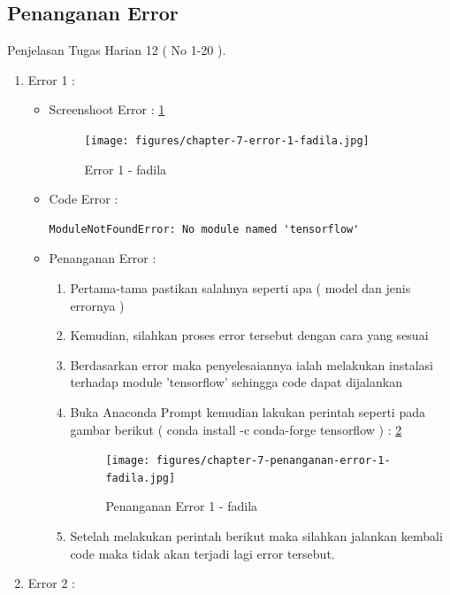 \subsection{Penanganan Error}
Penjelasan Tugas Harian 12 ( No 1-20 ).
\begin{enumerate}
\item Error 1	:
\begin{itemize}
\item Screenshoot Error 	: \ref{chapter-7-error-1-fadila}
\par
\par
\begin{figure}[!hbtp]
\centering
\texttt{[image: figures/chapter-7-error-1-fadila.jpg]}
\caption{Error 1 - fadila}
\label{chapter-7-error-1-fadila}
\end{figure}
\par
\item Code Error		:
\begin{lstlisting}
ModuleNotFoundError: No module named 'tensorflow'
\end{lstlisting}
\item Penanganan Error	:
\begin{enumerate}
\item Pertama-tama pastikan salahnya seperti apa ( model dan jenis errornya )
\item Kemudian, silahkan proses error tersebut dengan cara yang sesuai
\item Berdasarkan error maka penyelesaiannya ialah melakukan instalasi terhadap module 'tensorflow' sehingga code dapat dijalankan
\item Buka Anaconda Prompt kemudian lakukan perintah seperti pada gambar berikut ( conda install -c conda-forge tensorflow ) : \ref{chapter-7-penanganan-error-1-fadila}
\par
\begin{figure}[!hbtp]
\centering
\texttt{[image: figures/chapter-7-penanganan-error-1-fadila.jpg]}
\caption{Penanganan Error 1 - fadila}
\label{chapter-7-penanganan-error-1-fadila}
\end{figure}
\par
\item Setelah melakukan perintah berikut maka silahkan jalankan kembali code maka tidak akan terjadi lagi error tersebut.
\end{enumerate}
\end{itemize}
\par
\par
\item Error 2 :

\end{enumerate}
